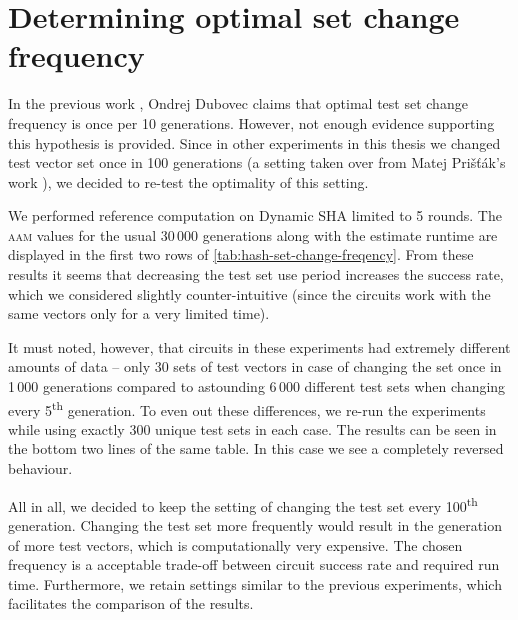 \documentclass[12pt,oneside]{fithesis2}		%
\renewcommand{\_}{\leavevmode \kern0.0em\vbox{\hrule width0.4em}}
\begin{document}
\section{Determining optimal set change frequency}
\label{sec:hash-set-change-freqency}

In the previous work \parencite{thesis-dubovec}, Ondrej Dubovec claims that optimal test set change frequency is once
per 10 generations. However, not enough evidence supporting this hypothesis is provided. Since in other experiments in this thesis
we changed test vector set once in 100 generations (a setting taken over from Matej Prišťák's work \parencite{thesis-pristak}), 
we decided to re-test the optimality of this setting.

We performed reference computation on Dynamic SHA limited to 5 rounds. The \textsc{aam} values for the usual 30\,000 generations
along with the estimate runtime are displayed in the first two rows of \autoref{tab:hash-set-change-freqency}.
From these results it seems that decreasing the test set use period increases the success rate, which we considered slightly
counter-intuitive (since the circuits work with the same vectors only for a very limited time).

It must noted, however, that circuits in these experiments had extremely different amounts of data -- only 30 sets of test vectors
in case of changing the set once in 1\,000 generations compared to astounding 6\,000 different test sets when changing every 
5\textsuperscript{th} generation. To even out these differences, we re-run the experiments while using exactly 300 unique test sets
in each case. The results can be seen in the bottom two lines of the same table. In this case we see a completely reversed
behaviour.

All in all, we decided to keep the setting of changing the test set every 100\textsuperscript{th} generation.
Changing the test set more frequently would result in the generation of more test vectors, which is computationally very expensive.
The chosen frequency is a acceptable trade-off between circuit success rate and required run time. 
Furthermore, we retain settings similar to the previous experiments, which facilitates the comparison of the results.
\bigskip
\end{document}
